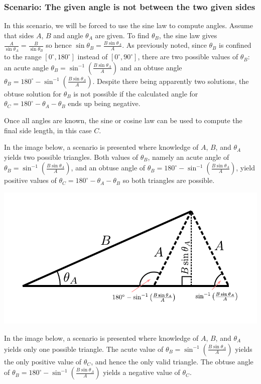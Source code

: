 \documentclass{article}
\begin{document}
\subsubsection*{Scenario: The given angle is not between the two given sides}

In this scenario, we will be forced to use the sine law to compute angles. Assume that sides \(A\), \(B\) and angle \(\theta_A\) are given. To find \(\theta_B\), the sine law gives \(\frac{A}{\sin\theta_A} = \frac{B}{\sin\theta_B}\) so hence \(\sin\theta_B = \frac{B\sin\theta_A}{A}\). As previously noted, since \(\theta_B\) is confined to the range \([0^\circ, 180^\circ]\) instead of \([0^\circ, 90^\circ]\), there are two possible values of \(\theta_B\): an acute angle \(\theta_B = \sin^{-1}\left(\frac{B\sin\theta_A}{A}\right)\) and an obtuse angle \(\theta_B = 180^\circ - \sin^{-1}\left(\frac{B\sin\theta_A}{A}\right)\). Despite there being apparently two solutions, the obtuse solution for \(\theta_B\) is not possible if the calculated angle for \(\theta_C = 180^\circ - \theta_A - \theta_B\) ends up being negative. 

Once all angles are known, the sine or cosine law can be used to compute the final side length, in this case \(C\).

In the image below, a scenario is presented where knowledge of \(A\), \(B\), and \(\theta_A\) yields two possible triangles. Both values of \(\theta_B\), namely an acute angle of \(\theta_B = \sin^{-1}\left(\frac{B\sin\theta_A}{A}\right)\), and an obtuse angle of \(\theta_B = 180^\circ - \sin^{-1}\left(\frac{B\sin\theta_A}{A}\right)\), yield positive values of \(\theta_C = 180^\circ - \theta_A - \theta_B\) so both triangles are possible. 

\includegraphics[scale = 1.0]{side_side_angle}

In the image below, a scenario is presented where knowledge of \(A\), \(B\), and \(\theta_A\) yields only one possible triangle. The acute value of \(\theta_B = \sin^{-1}\left(\frac{B\sin\theta_A}{A}\right)\) yields the only positive value of \(\theta_C\), and hence the only valid triangle. The obtuse angle of \(\theta_B = 180^\circ - \sin^{-1}\left(\frac{B\sin\theta_A}{A}\right)\) yields a negative value of \(\theta_C\).
\end{document}
